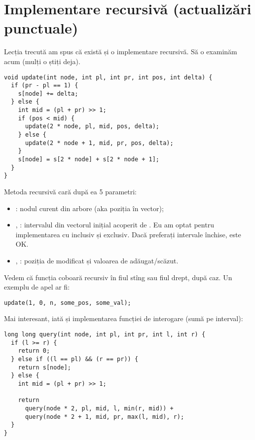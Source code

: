 \section{Implementare recursivă (actualizări punctuale)}

Lecția trecută am spus că există și o implementare recursivă. Să o examinăm acum (mulți o știți deja).

\begin{verbatim}
void update(int node, int pl, int pr, int pos, int delta) {
  if (pr - pl == 1) {
    s[node] += delta;
  } else {
    int mid = (pl + pr) >> 1;
    if (pos < mid) {
      update(2 * node, pl, mid, pos, delta);
    } else {
      update(2 * node + 1, mid, pr, pos, delta);
    }
    s[node] = s[2 * node] + s[2 * node + 1];
  }
}
\end{verbatim}

Metoda recursivă cară după ea 5 parametri:

\begin{itemize}
  \item {}: nodul curent din arbore (aka poziția în vector);

  \item {}, : intervalul din vectorul inițial acoperit de . Eu am optat pentru implementarea cu  inclusiv și  exclusiv. Dacă preferați intervale închise, este OK.

  \item {}, : poziția de modificat și valoarea de adăugat/scăzut.
\end{itemize}

Vedem că funcția coboară recursiv în fiul stîng sau fiul drept, după caz. Un exemplu de apel ar fi:

\begin{verbatim}
update(1, 0, n, some_pos, some_val);
\end{verbatim}

Mai interesant, iată și implementarea funcției de interogare (sumă pe interval):

\begin{verbatim}
long long query(int node, int pl, int pr, int l, int r) {
  if (l >= r) {
    return 0;
  } else if ((l == pl) && (r == pr)) {
    return s[node];
  } else {
    int mid = (pl + pr) >> 1;

    return
      query(node * 2, pl, mid, l, min(r, mid)) +
      query(node * 2 + 1, mid, pr, max(l, mid), r);
  }
}
\end{verbatim}


